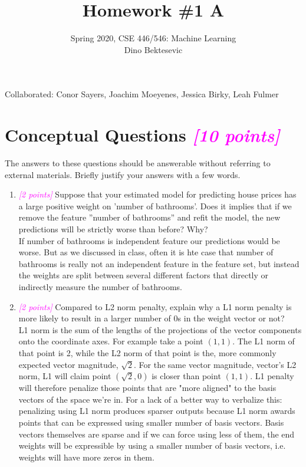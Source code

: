 \documentclass{article}
\date{{}}
\newcommand{\1}{\mathbf{1}}
\newcommand{\points}[1]{\small\textcolor{magenta}{\emph{[#1 points]}} \normalsize}
\begin{document}
\title{Homework \#1 A}
\author{\normalsize{Spring 2020, CSE 446/546: Machine Learning}\\
\normalsize{Dino Bektesevic}}
\maketitle

Collaborated: Conor Sayers, Joachim Moeyenes, Jessica Birky, Leah Fulmer

\section*{Conceptual Questions \points{10} }
The answers to these questions should be answerable without referring to external materials.  Briefly justify your answers with a few words.
\begin{enumerate}
    \item \points{2} Suppose that your estimated model for predicting house prices has a large positive weight on ’number of bathrooms’. Does it implies that if we remove the feature ”number of bathrooms” and refit the model, the new predictions will be strictly worse than before?  Why?\\
    If number of bathrooms is independent feature our predictions would be worse. But as we discussed in class, often it is hte case that number of bathrooms is really not an independent feature in the feature set, but instead the weights are split between several different factors that directly or indirectly measure the number of bathrooms. 
        
    \item \points{2} Compared to L2 norm penalty, explain why a L1 norm penalty is more likely to result in a larger number of 0s in the weight vector or not?\\
    L1 norm is the sum of the lengths of the projections of the vector components onto the coordinate axes. For example take a point $(1, 1)$. The L1 norm of that point is 2, while the L2 norm of that point is the, more commonly expected vector magnitude, $\sqrt2$. For the same vector magnitude, vector's L2 norm, L1 will claim point $(\sqrt 2, 0)$ is closer than point $(1, 1)$. L1 penalty will therefore penalize those points that are "more aligned" to the basis vectors of the space we're in. For a lack of a better way to verbalize this: penalizing using L1 norm produces sparser outputs because L1 norm awards points that can be expressed using smaller number of basis vectors. Basis vectors themselves are sparse and if we can force using less of them, the end weights will be expressible by using a smaller number of basis vectors, i.e. weights will have more zeros in them.
        

\end{enumerate}
\end{document}
